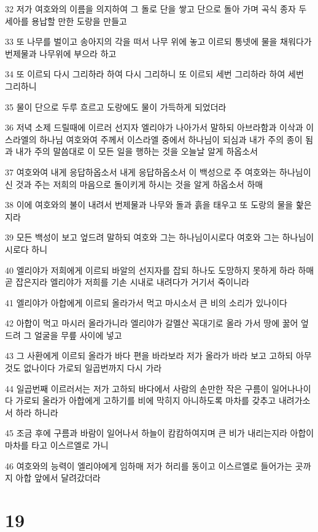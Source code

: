 \par 32 저가 여호와의 이름을 의지하여 그 돌로 단을 쌓고 단으로 돌아 가며 곡식 종자 두 세아를 용납할 만한 도랑을 만들고
\par 33 또 나무를 벌이고 송아지의 각을 떠서 나무 위에 놓고 이르되 통넷에 물을 채워다가 번제물과 나무위에 부으라 하고
\par 34 또 이르되 다시 그리하라 하여 다시 그리하니 또 이르되 세번 그리하라 하여 세번 그리하니
\par 35 물이 단으로 두루 흐르고 도랑에도 물이 가득하게 되었더라
\par 36 저녁 소제 드릴때에 이르러 선지자 엘리야가 나아가서 말하되 아브라함과 이삭과 이스라엘의 하나님 여호와여 주께서 이스라엘 중에서 하나님이 되심과 내가 주의 종이 됨과 내가 주의 말씀대로 이 모든 일을 행하는 것을 오늘날 알게 하옵소서
\par 37 여호와여 내게 응답하옵소서 내게 응답하옵소서 이 백성으로 주 여호와는 하나님이신 것과 주는 저희의 마음으로 돌이키게 하시는 것을 알게 하옵소서 하매
\par 38 이에 여호와의 불이 내려서 번제물과 나무와 돌과 흙을 태우고 또 도랑의 물을 핥은지라
\par 39 모든 백성이 보고 엎드려 말하되 여호와 그는 하나님이시로다 여호와 그는 하나님이시로다 하니
\par 40 엘리야가 저희에게 이르되 바알의 선지자를 잡되 하나도 도망하지 못하게 하라 하매 곧 잡은지라 엘리야가 저희를 기손 시내로 내려다가 거기서 죽이니라
\par 41 엘리야가 아합에게 이르되 올라가서 먹고 마시소서 큰 비의 소리가 있나이다
\par 42 아합이 먹고 마시러 올라가니라 엘리야가 갈멜산 꼭대기로 올라 가서 땅에 꿇어 엎드려 그 얼굴을 무릎 사이에 넣고
\par 43 그 사환에게 이르되 올라가 바다 편을 바라보라 저가 올라가 바라 보고 고하되 아무것도 없나이다 가로되 일곱번까지 다시 가라
\par 44 일곱번째 이르러서는 저가 고하되 바다에서 사람의 손만한 작은 구름이 일어나나이다 가로되 올라가 아합에게 고하기를 비에 막히지 아니하도록 마차를 갖추고 내려가소서 하라 하니라
\par 45 조금 후에 구름과 바람이 일어나서 하늘이 캄캄하여지며 큰 비가 내리는지라 아합이 마차를 타고 이스르엘로 가니
\par 46 여호와의 능력이 엘리야에게 임하매 저가 허리를 동이고 이스르엘로 들어가는 곳까지 아합 앞에서 달려갔더라

\chapter{19}

